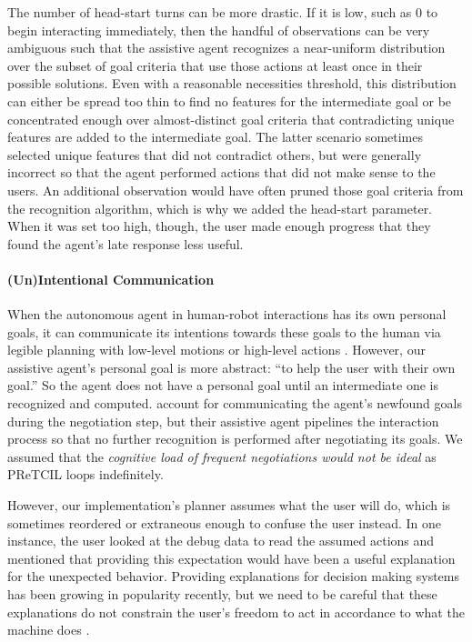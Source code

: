 \documentclass[letterpaper]{article} %
\begin{document}
The number of head-start turns can be more drastic.  If it is low, such as $0$ to begin interacting immediately, then the handful of observations can be very ambiguous such that the assistive agent recognizes a near-uniform distribution over the subset of goal criteria that use those actions at least once in their possible solutions.  Even with a reasonable necessities threshold, this distribution can either be spread too thin to find no features for the intermediate goal or be concentrated enough over almost-distinct goal criteria that contradicting unique features are added to the intermediate goal.  The latter scenario sometimes selected unique features that did not contradict others, but were generally incorrect so that the agent performed actions that did not make sense to the users.  An additional observation would have often pruned those goal criteria from the recognition algorithm, which is why we added the head-start parameter.  When it was set too high, though, the user made enough progress that they found the agent's late response less useful. %



\paragraph{(Un)Intentional Communication} When the autonomous agent in human-robot interactions has its own personal goals, it can communicate its intentions towards these goals to the human via legible planning with low-level motions \cite{Dragan-2013-7732} or high-level actions \cite{DBLP:conf/aaai/KulkarniSK19}.  However, our assistive agent's personal goal is more abstract: ``to help the user with their own goal.''  So the agent does not have a personal goal until an intermediate one is recognized and computed.  \citeauthor{geibPetrick_2016}  account for communicating the agent's newfound goals during the negotiation step, but their assistive agent pipelines the interaction process so that no further recognition is performed after negotiating its goals. %
 We assumed that the \textit{cognitive load of frequent negotiations would not be ideal} as {\sc PReTCIL} loops indefinitely.

However, our implementation's planner assumes what the user will do, which is sometimes reordered or extraneous enough to confuse the user instead.  In one instance, the user looked at the debug data to read the assumed actions and mentioned that providing this expectation would have been a useful explanation for the unexpected behavior.  Providing explanations for decision making systems \cite{xaip} has been growing in popularity recently, but we need to be careful that these explanations do not constrain the user's freedom to act in accordance to what the machine does \cite{DBLP:conf/aaaifs/CastroRMB17}.
\end{document}
